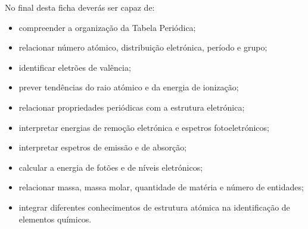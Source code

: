 \documentclass[11pt,a4paper]{article}
\begin{document}
	\begin{tcolorbox}[
		colback=eugray,
		colframe=eudark,
		title=\textbf{Objetivos de aprendizagem}
		]
		
		No final desta ficha deverás ser capaz de:
		
		\begin{itemize}[leftmargin=6mm,itemsep=1mm]
			
			\item compreender a organização da Tabela Periódica;
			
			\item relacionar número atómico, distribuição eletrónica,
			período e grupo;
			
			\item identificar eletrões de valência;
			
			\item prever tendências do raio atómico e da energia de ionização;
			
			\item relacionar propriedades periódicas com a estrutura eletrónica;
			
			\item interpretar energias de remoção eletrónica e espetros
			fotoeletrónicos;
			
			\item interpretar espetros de emissão e de absorção;
			
			\item calcular a energia de fotões e de níveis eletrónicos;
			
			\item relacionar massa, massa molar, quantidade de matéria
			e número de entidades;
			
			\item integrar diferentes conhecimentos de estrutura atómica
			na identificação de elementos químicos.
			
		\end{itemize}
		
	\end{tcolorbox}
	
	
\end{document}
